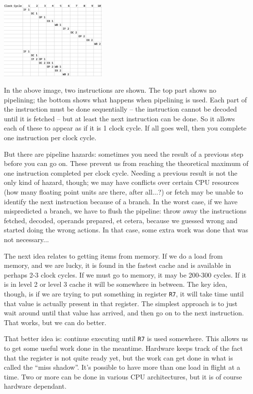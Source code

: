 \begin{center}
\includegraphics[width=0.4\textwidth]{images/pipelining}
\end{center}

In the above image, two instructions are shown. The top part shows no pipelining; the bottom shows what happens when pipelining is used. Each part of the instruction must be done sequentially -- the instruction cannot be decoded until it is fetched -- but at least the next instruction can be done. So it allows each of these to appear as if it is 1 clock cycle. If all goes well, then you complete one instruction per clock cycle. 

But there are pipeline hazards: sometimes you need the result of a previous step before you can go on. These prevent us from reaching the theoretical maximum of one instruction completed per clock cycle. Needing a previous result is not the only kind of hazard, though; we may have conflicts over certain CPU resources (how many floating point units are there, after all...?) or fetch may be unable to identify the next instruction because of a branch. In the worst case, if we have mispredicted a branch, we have to flush the pipeline: throw away the instructions fetched, decoded, operands prepared, et cetera, because we guessed wrong and started doing the wrong actions. In that case, some extra work was done that was not necessary... 

The next idea relates to getting items from memory. If we do a load from memory, and we are lucky, it is found in the fastest cache and is available in perhaps 2-3 clock cycles. If we must go to memory, it may be 200-300 cycles. If it is in level 2 or level 3 cache it will be somewhere in between. The key idea, though, is if we are trying to put something in register \texttt{R7}, it will take time until that value is actually present in that register. The simplest approach is to just wait around until that value has arrived, and then go on to the next instruction. That works, but we can do better.

That better idea is: continue executing until \texttt{R7} is used somewhere. This allows us to get some useful work done in the meantime. Hardware keeps track of the fact that the register is not quite ready yet, but the work can get done in what is called the ``miss shadow''. It's possible to have more than one load in flight at a time. Two or more can be done in various CPU architectures, but it is of course hardware dependant. 

